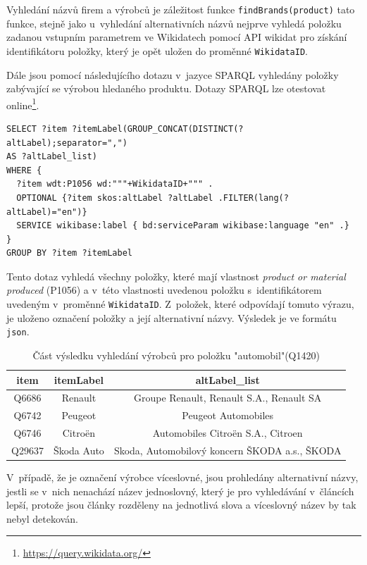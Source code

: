 Vyhledání názvů firem a výrobců je záležitost funkce \verb|findBrands(product)| tato funkce, stejně jako u~vyhledání alternativních názvů nejprve vyhledá položku zadanou vstupním parametrem ve Wikidatech pomocí API wikidat pro získání identifikátoru položky, který je opět uložen do proměnné \verb|WikidataID|.

Dále jsou pomocí následujícího dotazu v~jazyce SPARQL vyhledány položky zabývající se výrobou hledaného produktu. Dotazy SPARQL lze otestovat online\footnote{\url{https://query.wikidata.org/}}.

\begin{minipage}{\linewidth}
\begin{lstlisting}[language=SPARQL]
SELECT ?item ?itemLabel(GROUP_CONCAT(DISTINCT(?altLabel);separator=",")
AS ?altLabel_list)
WHERE {
  ?item wdt:P1056 wd:"""+WikidataID+""" .
  OPTIONAL {?item skos:altLabel ?altLabel .FILTER(lang(?altLabel)="en")}
  SERVICE wikibase:label { bd:serviceParam wikibase:language "en" .}
}
GROUP BY ?item ?itemLabel
\end{lstlisting}
\end{minipage}

Tento dotaz vyhledá všechny položky, které mají vlastnost \textit{product or material produced} (P1056) a v~této vlastnosti uvedenou položku s~identifikátorem uvedeným v~proměnné \verb|WikidataID|. Z~položek, které odpovídají tomuto výrazu, je uloženo označení položky a její alternativní názvy. Výsledek je ve formátu \verb|json|.

\begin{table}[h]
    \centering
    \begin{tabular}{||c|c|c||} 
        \hline
        item & itemLabel & altLabel\_list\\ [0.5ex] 
        \hline\hline
        Q6686 & Renault & Groupe Renault, Renault S.A., Renault SA \\ 
        \hline
        Q6742 & Peugeot & 	Peugeot Automobiles \\
        \hline
        Q6746 & Citroën & Automobiles Citroën S.A., Citroen \\
        \hline
        Q29637 & Škoda Auto & Skoda, Automobilový koncern ŠKODA a.s., ŠKODA \\
        \hline
    \end{tabular}
    \caption{Část výsledku vyhledání výrobců pro položku "automobil"(Q1420)}
    \label{tab:vyhledani_vyrobcu}
\end{table}

 V~případě, že je označení výrobce víceslovné, jsou prohledány alternativní názvy, jestli se v~nich nenachází název jednoslovný, který je pro vyhledávání v~článcích lepší, protože jsou články rozděleny na jednotlivá slova a víceslovný název by tak nebyl detekován.
 

